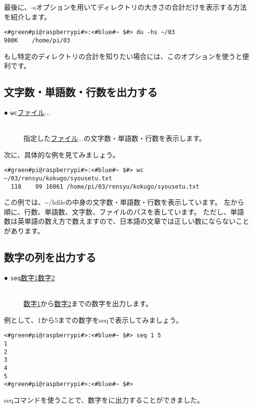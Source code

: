 最後に、-sオプションを用いてディレクトリの大きさの合計だけを表示する方法を紹介します。
\begin{lstlisting}[caption=du -hsの実行例, label=du_example]
<#green#pi@raspberrypi#>:<#blue#~ $#> du -hs ~/03
980K	/home/pi/03
\end{lstlisting}
もし特定のディレクトリの合計を知りたい場合には、このオプションを使うと便利です。

\subsection{文字数・単語数・行数を出力する}
\begin{description}
    \item[● \texttt{wc}\textvisiblespace \underline{ファイル}$\ldots$]\mbox{}\\
    指定した\underline{ファイル}$\ldots$の文字数・単語数・行数を表示します。
\end{description}
次に、具体的な例を見てみましょう。
\begin{lstlisting}[caption=wcコマンドの実行例, label=wc_example]
<#green#pi@raspberrypi#>:<#blue#~ $#> wc ~/03/rensyu/kokugo/syousetu.txt
  118    99 16061 /home/pi/03/rensyu/kokugo/syousetu.txt
\end{lstlisting}
この例では、\textasciitilde/lsfileの中身の文字数・単語数・行数を表示しています。
左から順に、行数、単語数、文字数、ファイルのパスを表しています。
ただし、単語数は英単語の数え方で数えますので、日本語の文章では正しい数にならないことがあります。

\subsection{数字の列を出力する}
\begin{description}
    \item[● \texttt{seq}\textvisiblespace \underline{数字1}\textvisiblespace \underline{数字2}]\mbox{}\\
    \underline{数字1}から\underline{数字2}までの数字を出力します。
\end{description}
例として、1から5までの数字をseqで表示してみましょう。
\begin{lstlisting}[caption=seqコマンド]
<#green#pi@raspberrypi#>:<#blue#~ $#> seq 1 5
1
2
3
4
5
<#green#pi@raspberrypi#>:<#blue#~ $#>
\end{lstlisting}
seqコマンドを使うことで、数字をに出力することができました。

